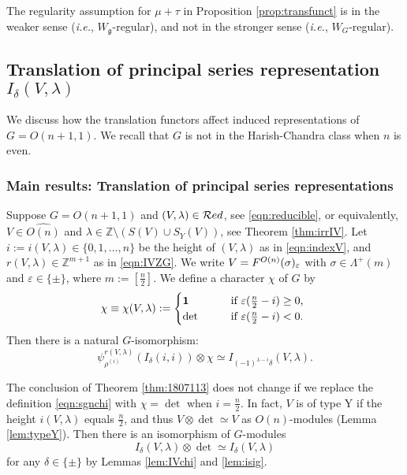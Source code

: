 \begin{remark}
The regularity assumption 
 for $\mu + \tau$
 in Proposition \ref{prop:transfunct}
 is in the weaker sense
 ({\it{i.e.}}, $W_{\mathfrak{g}}$-regular), 
 and not in the stronger sense
 ({\it{i.e.}}, $W_G$-regular). 
\end{remark}

\subsection{Translation of principal series representation $I_{\delta}(V,\lambda)$}

We discuss how the translation functors affect 
 induced representations
 of $G=O(n+1,1)$.  
We recall that $G$ is not in the Harish-Chandra class when $n$ is even.  

\subsubsection{Main results: Translation of principal series representations}
\begin{theorem}
\label{thm:1807113}
Suppose $G=O(n+1,1)$
 and $(V,\lambda) \in {\mathcal{R}}ed$, 
 see \eqref{eqn:reducible}, 
 or equivalently,
 $V \in \widehat {O(n)}$
 and $\lambda \in {\mathbb{Z}} \setminus (S(V) \cup S_Y(V))$, 
 see Theorem \ref{thm:irrIV}.  
Let $i:=i(V,\lambda) \in \{0,1,\ldots,n\}$ be the height of $(V,\lambda)$
 as in \eqref{eqn:indexV}, 
 and $r(V, \lambda)\in {\mathbb{Z}}^{m+1}$ as in \eqref{eqn:IVZG}.  
We write $V=F^{{O(n)}}({\sigma})_{\varepsilon}$
 with $\sigma \in \Lambda^+(m)$ and $\varepsilon \in \{\pm\}$, 
 where $m:=[\frac n 2]$.  
We define a character $\chi$ of $G$ by
\begin{equation}
\label{eqn:sgnchi}
\chi \equiv \chi(V,\lambda):=
\begin{cases}
{\bf{1}}
&\text{if $\varepsilon(\frac n 2-i) \ge 0$,}
\\
\det
\qquad
&\text{if $\varepsilon(\frac n 2-i) < 0$.  }
\end{cases}
\end{equation}
Then there is a natural $G$-isomorphism:
\[
  \psi_{\rho^{(i)}}^{r(V,\lambda)}(I_{\delta}(i,i)) \otimes \chi
  \simeq 
  I_{(-1)^{\lambda-i}\delta}(V,\lambda).  
\]
\end{theorem}

\begin{remark}
\label{rem:FVchipm}
The conclusion of Theorem \ref{thm:1807113} does not change
 if we replace the definition \eqref{eqn:sgnchi}
 with $\chi=\det$
 when $i=\frac n 2$.  
In fact, 
$V$ is of type Y
 if the height $i(V,\lambda)$ equals $\frac n 2$, 
and thus $V \otimes \det \simeq V$
 as $O(n)$-modules
 (Lemma \ref{lem:typeY}).  
Then there is an isomorphism of $G$-modules
\[
   I_{\delta}(V,\lambda) \otimes \det \simeq I_{\delta}(V,\lambda)
\]
for any $\delta \in \{\pm\}$
 by Lemmas \ref{lem:IVchi} and \ref{lem:isig}.  
\end{remark}

